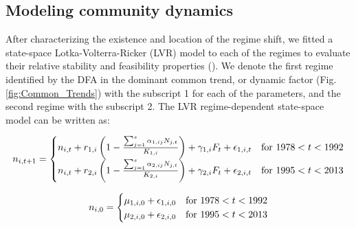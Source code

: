 \documentclass[12pt]{article}
\begin{document}
\subsection*{Modeling community dynamics}
\label{subsec:Modeling community dynamics}

After characterizing the existence and location of the regime shift, we fitted a state-space Lotka-Volterra-Ricker (LVR) model to each of the regimes to evaluate their relative stability and feasibility properties (\cite{Almaraz2011,Almaraz2012,Mutshinda2011}). We denote the first regime identified by the DFA in the dominant common trend, or dynamic factor (Fig. \ref{fig:Common_Trends}) with the subscript 1 for each of the parameters, and the second regime with the subscript 2. The LVR regime-dependent state-space model can be written as:

\begin{equation}\label{LVR_State_Equation_form}
	n_{i,t+1} = 
	\begin{cases}
		n_{i,t} + r_{1,i}\left(1 - \frac{\sum_{j=1}^{s}\alpha_{1,ij}N_{j,t}}{K_{1,i}} \right) + \gamma_{1,i}F_{t} + \epsilon_{1,i,t} & \text{for $ 1978 < t < 1992 $}\\
		n_{i,t} + r_{2,i}\left(1 - \frac{\sum_{j=1}^{s}\alpha_{2,ij}N_{j,t}}{K_{2,i}} \right) + \gamma_{2,i}F_{t} + \epsilon_{2,i,t} & \text{for $ 1995 < t < 2013 $}\\
	\end{cases}
\end{equation}

\begin{equation}\label{LVR_Initial_State}
	n_{i,0} = 
	\begin{cases}
		\mu_{1,i,0} + \epsilon_{1,i,0} & \text{for $ 1978 < t < 1992 $}\\
		\mu_{2,i,0} + \epsilon_{2,i,0} & \text{for $ 1995 < t < 2013 $}\\
	\end{cases}
\end{equation}
\end{document}
